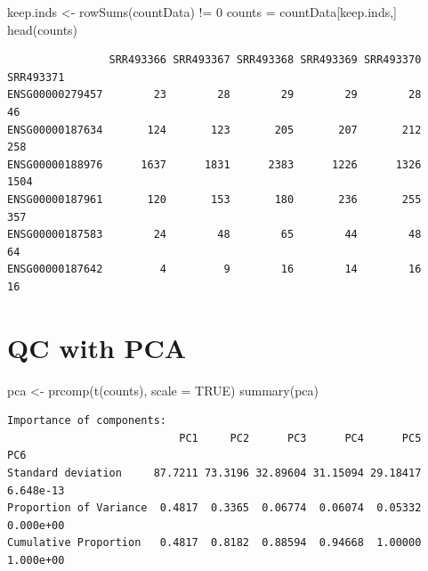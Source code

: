 \documentclass[
  letterpaper,
  DIV=11,
  numbers=noendperiod]{scrartcl}
\newenvironment{Shaded}{\begin{snugshade}}{\end{snugshade}}
\newcommand{\AttributeTok}[1]{\textcolor[rgb]{0.40,0.45,0.13}{#1}}
\newcommand{\ConstantTok}[1]{\textcolor[rgb]{0.56,0.35,0.01}{#1}}
\newcommand{\DecValTok}[1]{\textcolor[rgb]{0.68,0.00,0.00}{#1}}
\newcommand{\FunctionTok}[1]{\textcolor[rgb]{0.28,0.35,0.67}{#1}}
\newcommand{\NormalTok}[1]{\textcolor[rgb]{0.00,0.23,0.31}{#1}}
\newcommand{\OtherTok}[1]{\textcolor[rgb]{0.00,0.23,0.31}{#1}}
\newcommand{\SpecialCharTok}[1]{\textcolor[rgb]{0.37,0.37,0.37}{#1}}
\begin{document}
\begin{Shaded}
\begin{Highlighting}[]
\NormalTok{keep.inds }\OtherTok{\textless{}{-}} \FunctionTok{rowSums}\NormalTok{(countData) }\SpecialCharTok{!=} \DecValTok{0}
\NormalTok{counts }\OtherTok{=}\NormalTok{ countData[keep.inds,]}
\FunctionTok{head}\NormalTok{(counts)}
\end{Highlighting}
\end{Shaded}

\begin{verbatim}
                SRR493366 SRR493367 SRR493368 SRR493369 SRR493370 SRR493371
ENSG00000279457        23        28        29        29        28        46
ENSG00000187634       124       123       205       207       212       258
ENSG00000188976      1637      1831      2383      1226      1326      1504
ENSG00000187961       120       153       180       236       255       357
ENSG00000187583        24        48        65        44        48        64
ENSG00000187642         4         9        16        14        16        16
\end{verbatim}

\hypertarget{qc-with-pca}{%
\section{QC with PCA}\label{qc-with-pca}}

\begin{Shaded}
\begin{Highlighting}[]
\NormalTok{pca }\OtherTok{\textless{}{-}} \FunctionTok{prcomp}\NormalTok{(}\FunctionTok{t}\NormalTok{(counts), }\AttributeTok{scale =} \ConstantTok{TRUE}\NormalTok{)}
\FunctionTok{summary}\NormalTok{(pca)}
\end{Highlighting}
\end{Shaded}

\begin{verbatim}
Importance of components:
                           PC1     PC2      PC3      PC4      PC5       PC6
Standard deviation     87.7211 73.3196 32.89604 31.15094 29.18417 6.648e-13
Proportion of Variance  0.4817  0.3365  0.06774  0.06074  0.05332 0.000e+00
Cumulative Proportion   0.4817  0.8182  0.88594  0.94668  1.00000 1.000e+00
\end{verbatim}

\begin{Shaded}
\end{Shaded}
\end{document}
